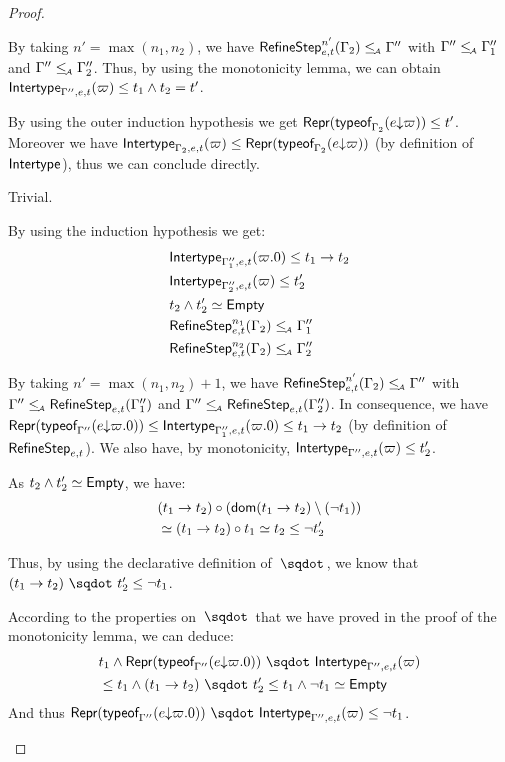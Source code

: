 \documentclass[a4paper]{article}
\theoremstyle{definition}
\begin{document}
\begin{proof}
\begin{description}
\begin{description}
      By taking $n'=\max (n_1,n_2)$,
      we have $\RefineStep {e,t}^{n'} (\Gamma_2) \leqA \Gamma''$ with $\Gamma'' \leqA \Gamma_1''$ and $\Gamma'' \leqA \Gamma_2''$.
      Thus, by using the monotonicity lemma, we can obtain $\env {\Gamma'',e,t} (\varpi) \leq t_1 \land t_2 = t'$.
      \item[\Rule{PTypeof}] By using the outer induction hypothesis we get
      $\tsrep{\tyof {\occ e \varpi} {\Gamma_2}} \leq t'$.
      Moreover we have $\env {\Gamma_2,e,t} (\varpi) \leq \tsrep{\tyof {\occ e \varpi} {\Gamma_2}}$
      (by definition of $\env {}$), thus we can conclude directly.
      \item[\Rule{PEps}] Trivial.
       
      \item[\Rule{PAppR}] By using the induction hypothesis we get:
      \begin{align*}
        &\env {\Gamma_1'',e,t} (\varpi.0) \leq \arrow {t_1} {t_2}\\
        &\env {\Gamma_2'',e,t} (\varpi) \leq t_2'\\
        & t_2\land t_2' \simeq \Empty\\
        &\RefineStep {e,t}^{n_1} (\Gamma_2) \leqA \Gamma_1''\\
        &\RefineStep {e,t}^{n_2} (\Gamma_2) \leqA \Gamma_2''
      \end{align*}
      
      By taking $n'=\max (n_1,n_2) + 1$,
      we have $\RefineStep {e,t}^{n'} (\Gamma_2) \leqA \Gamma''$ with $\Gamma'' \leqA \RefineStep {e,t} (\Gamma_1'')$
      and $\Gamma'' \leqA \RefineStep {e,t} (\Gamma_2'')$.
      In consequence, we have $\tsrep{\tyof {\occ e {\varpi.0}} {\Gamma''}} \leq \env {\Gamma_1'',e,t} (\varpi.0) \leq \arrow {t_1} {t_2}$
      (by definition of $\RefineStep {e,t}$).
      We also have, by monotonicity, $\env {\Gamma'',e,t} (\varpi) \leq t_2'$.

      As $t_2\land t_2' \simeq \Empty$, we have:
      \begin{align*}
        &\apply {(\arrow {t_1} {t_2})} {(\dom{\arrow {t_1} {t_2}}\setminus(\neg t_1))}\\
        &\simeq \apply {(\arrow {t_1} {t_2})} {t_1} \simeq t_2 \leq \neg t_2'
      \end{align*}

      Thus, by using the declarative definition of $\worra {} {}$, we know that
      $\worra {(\arrow {t_1} {t_2})} {t_2'} \leq \neg t_1$.

      According to the properties on $\worra {} {}$ that we have proved in the proof of the monotonicity lemma,
      we can deduce:
      \begin{align*}
      &t_1 \land \worra {\tsrep{\tyof {\occ e {\varpi.0}} {\Gamma''}}} {\env {\Gamma'',e,t} (\varpi)}\\
      &\leq t_1 \land \worra {(\arrow {t_1} {t_2})} {t_2'} \leq t_1 \land \neg t_1 \simeq \Empty
      \end{align*}
      And thus $\worra {\tsrep{\tyof {\occ e {\varpi.0}} {\Gamma''}}} {\env {\Gamma'',e,t} (\varpi)} \leq \neg t_1$.


\end{description}
\end{description}
\end{proof}
\end{document}
